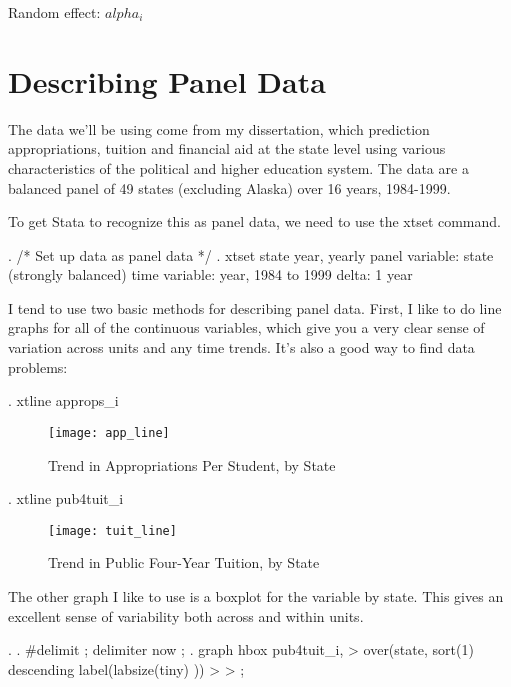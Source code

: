 \documentclass[12pt]{article}
\begin{document}
Random effect: $alpha_i$


\section{Describing Panel Data}

The data we'll be using come from my dissertation, which prediction
appropriations, tuition and financial aid at the state level using
various characteristics of the political and higher education
system. The data are a balanced panel of 49 states (excluding Alaska)
over 16 years, 1984-1999. 

To get Stata to recognize this as panel data, we need to use the xtset
command. 

\begin{stlog}
  . /* Set up data as panel data */
. xtset state year, yearly
       panel variable:  state (strongly balanced)
        time variable:  year, 1984 to 1999
                delta:  1 year
\end{stlog}

I tend to use two basic methods for describing panel data. First, I
like to do line graphs for all of the continuous variables, which give
you a very clear sense of variation across units and any time
trends. It's also a good way to find data problems:

\begin{stlog}
. xtline approps_i  
\end{stlog}



\begin{figure}[h]
  \centering
  \texttt{[image: app\_line]}
  \caption{Trend in Appropriations Per Student, by State}
\end{figure}

\begin{stlog}
. xtline pub4tuit_i
\end{stlog}

\begin{figure}[h]
  \centering
  \texttt{[image: tuit\_line]}
  \caption{Trend in Public Four-Year Tuition, by State}
\end{figure}


The other graph I like to use is a boxplot for the variable by
state. This gives an excellent sense of variability both across and
within units. 

\begin{stlog}
. 
. #delimit ;
delimiter now ;
. graph hbox pub4tuit_i,
> over(state, sort(1) descending label(labsize(tiny) )) 
> 
> ;  
\end{stlog}
\end{document}
